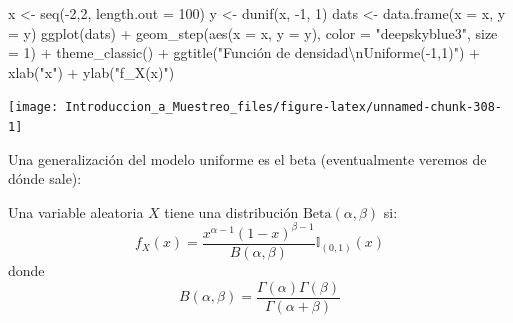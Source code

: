 \documentclass[
]{book}
\newenvironment{Shaded}{\begin{snugshade}}{\end{snugshade}}
\newcommand{\AttributeTok}[1]{\textcolor[rgb]{0.77,0.63,0.00}{#1}}
\newcommand{\DecValTok}[1]{\textcolor[rgb]{0.00,0.00,0.81}{#1}}
\newcommand{\FunctionTok}[1]{\textcolor[rgb]{0.00,0.00,0.00}{#1}}
\newcommand{\NormalTok}[1]{#1}
\newcommand{\OtherTok}[1]{\textcolor[rgb]{0.56,0.35,0.01}{#1}}
\newcommand{\SpecialCharTok}[1]{\textcolor[rgb]{0.00,0.00,0.00}{#1}}
\newcommand{\StringTok}[1]{\textcolor[rgb]{0.31,0.60,0.02}{#1}}
\begin{document}
\begin{Shaded}
\begin{Highlighting}[]
\NormalTok{x }\OtherTok{\textless{}{-}} \FunctionTok{seq}\NormalTok{(}\SpecialCharTok{{-}}\DecValTok{2}\NormalTok{,}\DecValTok{2}\NormalTok{, }\AttributeTok{length.out =} \DecValTok{100}\NormalTok{)}
\NormalTok{y }\OtherTok{\textless{}{-}} \FunctionTok{dunif}\NormalTok{(x, }\SpecialCharTok{{-}}\DecValTok{1}\NormalTok{, }\DecValTok{1}\NormalTok{)}
\NormalTok{dats }\OtherTok{\textless{}{-}} \FunctionTok{data.frame}\NormalTok{(}\AttributeTok{x =}\NormalTok{ x, }\AttributeTok{y =}\NormalTok{ y)}
\FunctionTok{ggplot}\NormalTok{(dats) }\SpecialCharTok{+} \FunctionTok{geom\_step}\NormalTok{(}\FunctionTok{aes}\NormalTok{(}\AttributeTok{x =}\NormalTok{ x, }\AttributeTok{y =}\NormalTok{ y), }\AttributeTok{color =} \StringTok{"deepskyblue3"}\NormalTok{, }\AttributeTok{size =} \DecValTok{1}\NormalTok{) }\SpecialCharTok{+} \FunctionTok{theme\_classic}\NormalTok{() }\SpecialCharTok{+} \FunctionTok{ggtitle}\NormalTok{(}\StringTok{"Función de densidad}\SpecialCharTok{\textbackslash{}n}\StringTok{Uniforme({-}1,1)"}\NormalTok{) }\SpecialCharTok{+}
  \FunctionTok{xlab}\NormalTok{(}\StringTok{"x"}\NormalTok{) }\SpecialCharTok{+} \FunctionTok{ylab}\NormalTok{(}\StringTok{"f\_X(x)"}\NormalTok{)}
\end{Highlighting}
\end{Shaded}

\begin{center}\texttt{[image: Introduccion\_a\_Muestreo\_files/figure-latex/unnamed-chunk-308-1]} \end{center}

Una generalización del modelo uniforme es el beta (eventualmente veremos de dónde sale):

Una variable aleatoria \(X\) tiene una distribución \(\text{Beta}(\alpha,\beta)\) si:
\[
f_X(x) = \dfrac{x^{\alpha - 1}(1-x)^{\beta - 1}}{B(\alpha, \beta)}\mathbb{I}_{(0,1)}(x)
\]
donde
\[
B(\alpha, \beta) = \dfrac{\Gamma (\alpha) \Gamma (\beta)}{\Gamma (\alpha + \beta)}
\]
\end{document}

